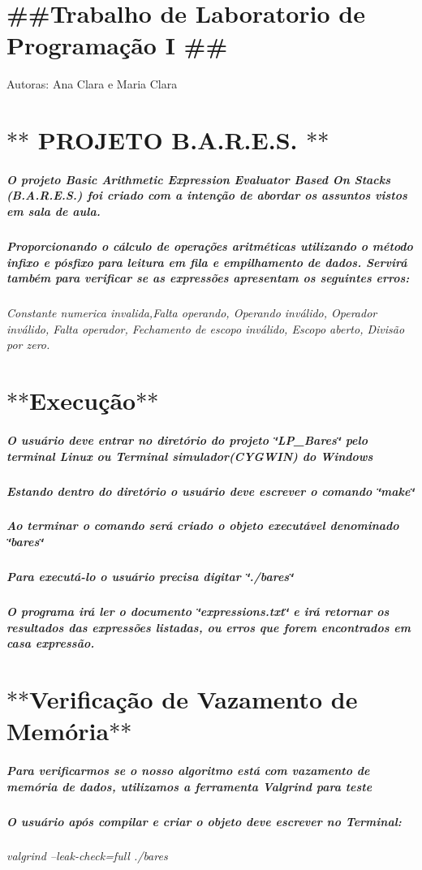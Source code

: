 \section*{\#\#\+Trabalho de Laboratorio de Programação I \#\#}

Autoras\+: Ana Clara e Maria Clara

\section*{$\ast$$\ast$ P\+R\+O\+J\+E\+T\+O B.\+A.\+R.\+E.\+S. $\ast$$\ast$}

\subparagraph*{O projeto Basic Arithmetic Expression Evaluator Based On Stacks (B.\+A.\+R.\+E.\+S.) foi criado com a intenção de abordar os assuntos vistos em sala de aula.}

\subparagraph*{Proporcionando o cálculo de operações aritméticas utilizando o método infixo e pósfixo para leitura em fila e empilhamento de dados. Servirá também para verificar se as expressões apresentam os seguintes erros\+:}

{\itshape Constante numerica invalida,Falta operando, Operando inválido, Operador inválido, Falta operador, Fechamento de escopo inválido, Escopo aberto, Divisão por zero.}

\section*{$\ast$$\ast$\+Execução$\ast$$\ast$}

\subparagraph*{O usuário deve entrar no diretório do projeto \char`\"{}\+L\+P\+\_\+\+Bares\char`\"{} pelo terminal Linux ou Terminal simulador(\+C\+Y\+G\+W\+I\+N) do Windows}

\subparagraph*{Estando dentro do diretório o usuário deve escrever o comando \char`\"{}make\char`\"{}}

\subparagraph*{Ao terminar o comando será criado o objeto executável denominado \char`\"{}bares\char`\"{}}

\subparagraph*{Para executá-\/lo o usuário precisa digitar \char`\"{}./bares\char`\"{}}

\subparagraph*{O programa irá ler o documento \char`\"{}expressions.\+txt\char`\"{} e irá retornar os resultados das expressões listadas, ou erros que forem encontrados em casa expressão.}

\section*{$\ast$$\ast$\+Verificação de Vazamento de Memória$\ast$$\ast$ }

\subparagraph*{Para verificarmos se o nosso algoritmo está com vazamento de memória de dados, utilizamos a ferramenta Valgrind para teste}

\subparagraph*{O usuário após compilar e criar o objeto deve escrever no Terminal\+:}

{\itshape valgrind --leak-\/check=full ./bares} 